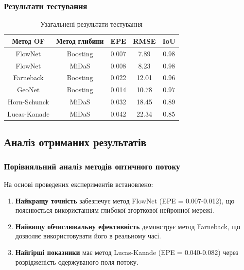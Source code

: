 \documentclass[14pt, a4paper]{extarticle}
\numberwithin{equation}{section}
\begin{document}
\subsubsection{Результати тестування}

\begin{table}[H]
\centering
\caption{Узагальнені результати тестування}
\begin{tabular}{|c|c|c|c|c|}
\hline
\textbf{Метод OF} & \textbf{Метод глибини} & \textbf{EPE} & \textbf{RMSE} & \textbf{IoU} \\
\hline
FlowNet & Boosting & 0.007 & 7.89 & 0.98 \\
FlowNet & MiDaS & 0.008 & 8.23 & 0.98 \\
Farneback & Boosting & 0.022 & 12.01 & 0.96 \\
GeoNet & Boosting & 0.014 & 10.78 & 0.97 \\
Horn-Schunck & MiDaS & 0.032 & 18.45 & 0.89 \\
Lucas-Kanade & MiDaS & 0.042 & 22.34 & 0.85 \\
\hline
\end{tabular}
\label{tab:results_summary}
\end{table}

\subsection{Аналіз отриманих результатів}

\subsubsection{Порівняльний аналіз методів оптичного потоку}

На основі проведених експериментів встановлено:

\begin{enumerate}
    \item \textbf{Найкращу точність} забезпечує метод FlowNet (EPE = 0.007-0.012), що пояснюється використанням глибокої згорткової нейронної мережі.
    
    \item \textbf{Найвищу обчислювальну ефективність} демонструє метод Farneback, що дозволяє використовувати його в реальному часі.
    
    \item \textbf{Найгірші показники} має метод Lucas-Kanade (EPE = 0.040-0.082) через розрідженість одержуваного поля потоку.
\end{enumerate}
\end{document}
